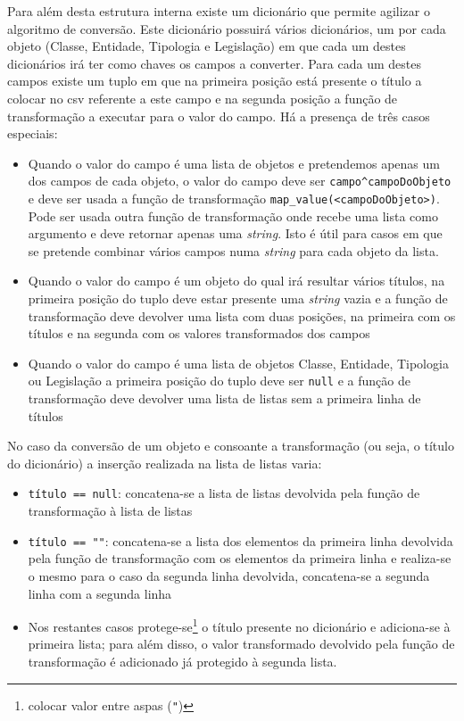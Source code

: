 Para além desta estrutura interna existe um dicionário que permite agilizar o algoritmo de conversão. Este dicionário possuirá vários dicionários, um por cada objeto (Classe, Entidade, Tipologia e Legislação) em que cada um destes dicionários irá ter como chaves os campos a converter. Para cada um destes campos existe um tuplo em que na primeira posição está presente o título a colocar no \acrshort{csv} referente a este campo e na segunda posição a função de transformação a executar para o valor do campo. Há a presença de três casos especiais:
\begin{itemize}
    \item Quando o valor do campo é uma lista de objetos e pretendemos apenas um dos campos de cada objeto, o valor do campo deve ser \verb|campo^campoDoObjeto| e deve ser usada a função de transformação \verb|map_value(<campoDoObjeto>)|. Pode ser usada outra função de transformação onde recebe uma lista como argumento e deve retornar apenas uma \textit{string}. Isto é útil para casos em que se pretende combinar vários campos numa \textit{string} para cada objeto da lista.
    \item Quando o valor do campo é um objeto do qual irá resultar vários títulos, na primeira posição do tuplo deve estar presente uma \textit{string} vazia e a função de transformação deve devolver uma lista com duas posições, na primeira com os títulos e na segunda com os valores transformados dos campos
    \item Quando o valor do campo é uma lista de objetos Classe, Entidade, Tipologia ou Legislação a primeira posição do tuplo deve ser \texttt{null} e a função de transformação deve devolver uma lista de listas sem a primeira linha de títulos
\end{itemize}
No caso da conversão de um objeto e consoante a transformação (ou seja, o título do dicionário) a inserção realizada na lista de listas varia:
\begin{itemize}
    \item \verb|título == null|: concatena-se a lista de listas devolvida pela função de transformação à lista de listas
    \item \verb|título == ""|: concatena-se a lista dos elementos da primeira linha devolvida pela função de transformação com os elementos da primeira linha e realiza-se o mesmo para o caso da segunda linha devolvida, concatena-se a segunda linha com a segunda linha
    \item Nos restantes casos protege-se\footnote{colocar valor entre aspas (\texttt{"})} o título presente no dicionário e adiciona-se à primeira lista; para além disso, o valor transformado devolvido pela função de transformação é adicionado já protegido à segunda lista.
\end{itemize}

